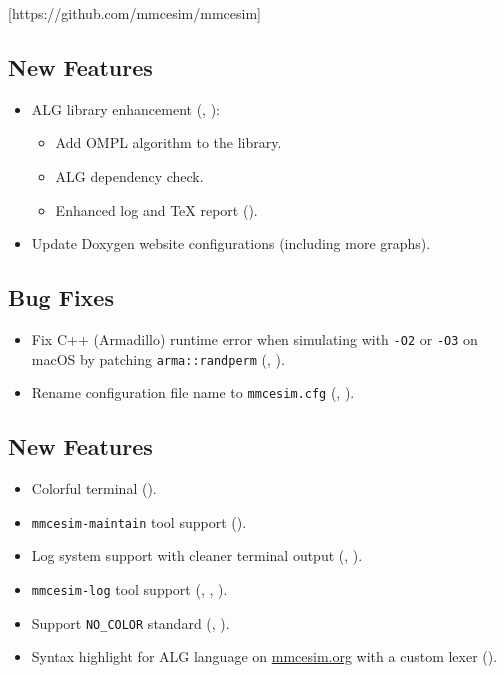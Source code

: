 [https://github.com/mmcesim/mmcesim]
\subsection*{New Features}
\begin{itemize}
  \item ALG library enhancement (, ):
  \begin{itemize}
    \item Add OMPL \cite{zhao2023ompl} algorithm to the library.
    \item ALG dependency check.
    \item Enhanced log and \TeX{} report ().
  \end{itemize}
  \item Update Doxygen website configurations (including more graphs).
\end{itemize}
\subsection*{Bug Fixes}
\begin{itemize}
  \item Fix C++ (Armadillo) runtime error when simulating with \texttt{-O2} or \texttt{-O3} on macOS by patching \texttt{arma::randperm} (, ).
  \item Rename configuration file name to \texttt{mmcesim.cfg} (, ).
\end{itemize}

\subsection*{New Features}
\begin{itemize}
  \item Colorful terminal ().
  \item \texttt{mmcesim-maintain} tool support ().
  \item Log system support with cleaner terminal output (, ).
  \item \texttt{mmcesim-log} tool support (, , ).
  \item Support \texttt{NO\_COLOR} standard (, ).
  \item Syntax highlight for ALG language on \href{https://mmcesim.org}{mmcesim.org} with a custom lexer ().
\end{itemize}

